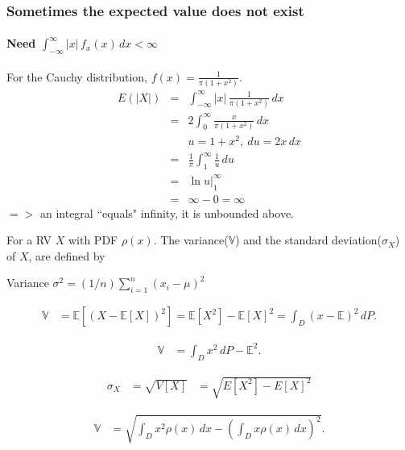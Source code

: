 \documentclass{beamer}
\begin{document}


\begin{frame}
\frametitle{Sometimes the expected value does not exist}
\framesubtitle{Need $ \int_{-\infty}^\infty |x| \, f_x(x) \, dx < \infty$}  
For the Cauchy distribution, $f(x) = \frac{1}{\pi(1+x^2)}$.  
\begin{eqnarray*}
	E(|X|) & = & \int_{-\infty}^\infty |x| \, \frac{1}{\pi(1+x^2)} \, dx \\ 
	& = & 2 \int_0^\infty \frac{x}{\pi(1+x^2)} \, dx \\ 
	&& u = 1+x^2, ~du = 2x \, dx \\  
	& = & \frac{1}{\pi} \int_1^\infty \frac{1}{u} \, du \\ 
	& = & \ln u |_1^\infty \\ 
	& = & \infty - 0 = \infty 
\end{eqnarray*} 
$=>$ an integral ``equals" infinity, it is unbounded above.
\end{frame}


\begin{frame}

For a RV $X$ with PDF $\rho(x)$. The variance($\mathbb{V}$) and the standard deviation($\sigma_X$) of $X$, are defined by

Variance   $\sigma^2 = (1/n)\sum_{i=1}^{n}(x_i - \mu)^2$

\begin{align*} \mathbb{V} &= \mathbb{E}\left[ \left( X-\mathbb{E}[X] \right)^2 \right]
=\mathbb{E}[X^2] - \mathbb{E}[X]^2
= \int_D (x-\mathbb{E})^2 \, dP. \end{align*}

\begin{align*} \mathbb{V} &= \int_D x^2 \, dP - \mathbb{E}^2. \end{align*} 

\begin{align*}\sigma_X&=\sqrt{V[X]}
&=\sqrt{E[X^2]-E[X]^2}
\end{align*}

\begin{align*} \mathbb{V} &=\sqrt{\int_D x^2\rho(x)\,dx - \left(\int_D x\rho(x) \,dx\right)^2}. \end{align*}


\end{frame}
\end{document}

